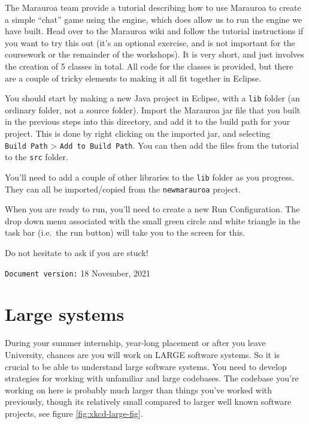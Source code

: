 \documentclass[
]{book}
\begin{document}
The Marauroa team provide a tutorial describing how to use Marauroa to create a simple ``chat'' game using the engine, which does allow us to run the engine we have built. Head over to the Marauroa wiki and follow the tutorial instructions if you want to try this out (it's an optional exercise, and is not important for the coursework or the remainder of the workshops). It is very short, and just involves the creation of 5 classes in total. All code for the classes is provided, but there are a couple of tricky elements to making it all fit together in Eclipse.

You should start by making a new Java project in Eclipse, with a \texttt{lib} folder (an ordinary folder, not a source folder). Import the Marauroa jar file that you built in the previous steps into this directory, and add it to the build path for your project. This is done by right clicking on the imported jar, and selecting \texttt{Build\ Path} \textgreater{} \texttt{Add\ to\ Build\ Path}. You can then add the files from the tutorial to the \texttt{src} folder.

You'll need to add a couple of other libraries to the \texttt{lib} folder as you progress. They can all be imported/copied from the \texttt{newmarauroa} project.

When you are ready to run, you'll need to create a new Run Configuration. The drop down menu associated with the small green circle and white triangle in the task bar (i.e.~the run button) will take you to the screen for this.

Do not hesitate to ask if you are stuck!

\texttt{Document\ version:} 18 November, 2021

\hypertarget{understanding}{%
\chapter{Large systems}\label{understanding}}

During your summer internship, year-long placement or after you leave University, chances are you will work on LARGE software systems. So it is crucial to be able to understand large software systems. You need to develop strategies for working with unfamiliar and large codebases. The codebase you're working on here is probably much larger than things you've worked with previously, though its relatively small compared to larger well known software projects, see figure \ref{fig:xkcd-large-fig}.
\end{document}
